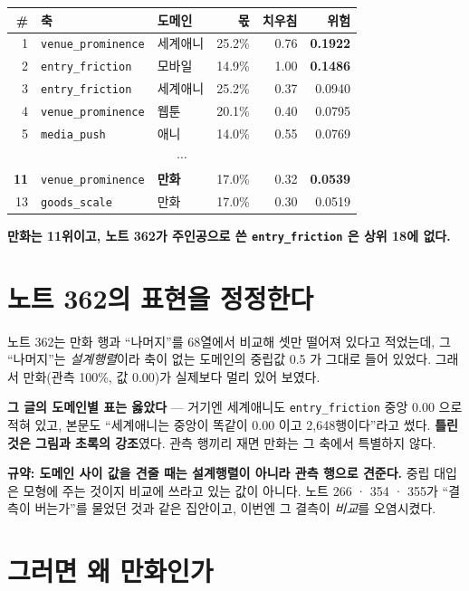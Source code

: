 \documentclass[11pt]{article}
\begin{document}
\begin{center}
\begin{tabular}{rllrrr}
\hline
\# & 축 & 도메인 & 몫 & 치우침 & 위험 \\
\hline
1 & \texttt{venue\_prominence} & 세계애니 & 25.2\% & 0.76 & \textbf{0.1922} \\
2 & \texttt{entry\_friction}   & 모바일   & 14.9\% & 1.00 & \textbf{0.1486} \\
3 & \texttt{entry\_friction}   & 세계애니 & 25.2\% & 0.37 & 0.0940 \\
4 & \texttt{venue\_prominence} & 웹툰     & 20.1\% & 0.40 & 0.0795 \\
5 & \texttt{media\_push}       & 애니     & 14.0\% & 0.55 & 0.0769 \\
\multicolumn{6}{c}{$\cdots$} \\
\textbf{11} & \texttt{venue\_prominence} & \textbf{만화} & 17.0\% & 0.32 & \textbf{0.0539} \\
13 & \texttt{goods\_scale}     & 만화     & 17.0\% & 0.30 & 0.0519 \\
\hline
\end{tabular}
\end{center}

\textbf{만화는 11위이고, 노트 362가 주인공으로 쓴 \texttt{entry\_friction}
은 상위 18에 없다.}

\section{노트 362의 표현을 정정한다}

노트 362는 만화 행과 ``나머지''를 68열에서 비교해 셋만 떨어져 있다고
적었는데, 그 ``나머지''는 \emph{설계행렬}이라 축이 없는 도메인의 중립값
0.5 가 그대로 들어 있었다. 그래서 만화(관측 100\%, 값 0.00)가 실제보다
멀리 있어 보였다.

\textbf{그 글의 도메인별 표는 옳았다} --- 거기엔 세계애니도
\texttt{entry\_friction} 중앙 0.00 으로 적혀 있고, 본문도 ``세계애니는
중앙이 똑같이 0.00 이고 2,648행이다''라고 썼다. \textbf{틀린 것은 그림과
초록의 강조}였다. 관측 행끼리 재면 만화는 그 축에서 특별하지 않다.

\textbf{규약: 도메인 사이 값을 견줄 때는 설계행렬이 아니라 관측 행으로
견준다.} 중립 대입은 모형에 주는 것이지 비교에 쓰라고 있는 값이 아니다.
노트 266 · 354 · 355가 ``결측이 버는가''를 물었던 것과 같은 집안이고,
이번엔 그 결측이 \emph{비교}를 오염시켰다.

\section{그러면 왜 만화인가}
\end{document}
